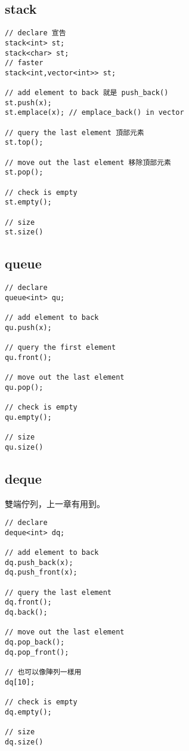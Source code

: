     \subsection{stack}

\begin{lstlisting}[caption=stack 用法]
// declare 宣告
stack<int> st;
stack<char> st;
// faster
stack<int,vector<int>> st;

// add element to back 就是 push_back()
st.push(x);
st.emplace(x); // emplace_back() in vector

// query the last element 頂部元素
st.top();

// move out the last element 移除頂部元素
st.pop();

// check is empty
st.empty();

// size
st.size()
\end{lstlisting}

    \subsection{queue}

\begin{lstlisting}[caption=queue 用法]
// declare
queue<int> qu;

// add element to back
qu.push(x);

// query the first element
qu.front();

// move out the last element
qu.pop();

// check is empty
qu.empty();

// size
qu.size()
\end{lstlisting}

    \subsection{deque}

    雙端佇列，上一章有用到。

\begin{lstlisting}[caption=deque 用法]
// declare
deque<int> dq;

// add element to back
dq.push_back(x);
dq.push_front(x);

// query the last element
dq.front();
dq.back();

// move out the last element
dq.pop_back();
dq.pop_front();

// 也可以像陣列一樣用
dq[10];

// check is empty
dq.empty();

// size
dq.size()
\end{lstlisting}

